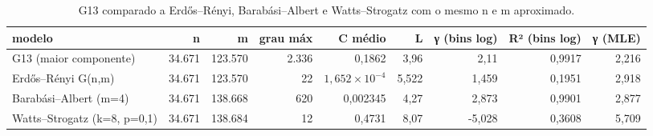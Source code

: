 \begin{table}[htbp]
\centering
\small
\caption{G13 comparado a Erdős–Rényi, Barabási–Albert e Watts–Strogatz com o mesmo n e m aproximado.}
\label{tab:09_modelos_classicos}
\begin{tabular}{lrrrrrrrr}
\toprule
modelo & n & m & grau máx & C médio & L & γ (bins log) & R² (bins log) & γ (MLE) \\
\midrule
G13 (maior componente) & 34.671 & 123.570 & 2.336 & 0,1862 & 3,96 & 2,11 & 0,9917 & 2,216 \\
Erdős–Rényi G(n,m) & 34.671 & 123.570 & 22 & $1,652 \times 10^{-4}$ & 5,522 & 1,459 & 0,1951 & 2,918 \\
Barabási–Albert (m=4) & 34.671 & 138.668 & 620 & 0,002345 & 4,27 & 2,873 & 0,9901 & 2,877 \\
Watts–Strogatz (k=8, p=0,1) & 34.671 & 138.684 & 12 & 0,4731 & 8,07 & -5,028 & 0,3608 & 5,709 \\
\bottomrule
\end{tabular}
\end{table}
